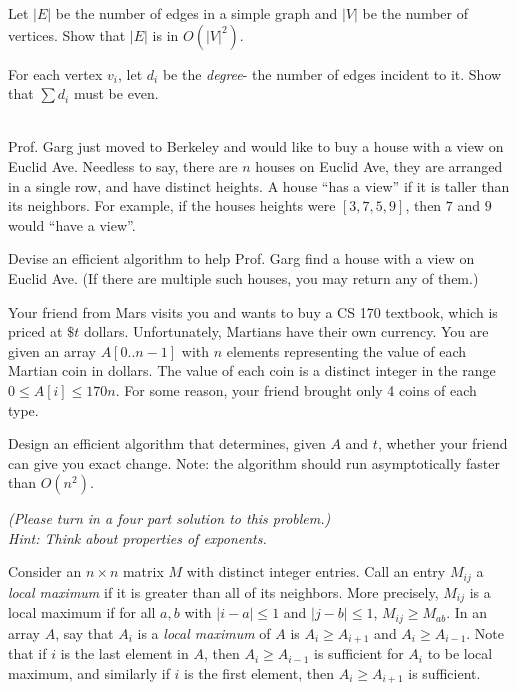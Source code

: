 \begin{qunlist}
\begin{qparts}
\item Let $|E|$ be the number of edges in a simple graph and $|V|$ be the number of vertices. Show that $|E|$ is in $O(|V|^2).$



\item For each vertex $v_i$, let $d_i$ be the \textit{degree}- the number of edges incident to it. Show that $\sum d_i$ must be even.



\end{qparts}

\pagebreak


 \\
Prof. Garg just moved to Berkeley and would like to buy a house with a view on Euclid Ave. 
Needless to say, there are $n$ houses on Euclid Ave, they are arranged in a single row, and have distinct heights. 
A house ``has a view'' if it is taller than its neighbors. 
For example, if the houses heights were $[3, 7, 5, 9]$, then $7$ and $9$ would ``have a view''.

Devise an efficient algorithm to help Prof. Garg find a house with a view on Euclid Ave. 
(If there are multiple such houses, you may return any of them.)



\pagebreak


Your friend from Mars visits you and wants to buy a CS 170 textbook, which is priced at $\$t$ dollars. Unfortunately, Martians have their own currency. You are given an array $A[0..n-1]$ with $n$ elements representing the value of each Martian coin in dollars. The value of each coin is a distinct integer in the range $0 \le A[i] \le 170n$. For some reason, your friend brought only 4 coins of each type. 

Design an efficient algorithm that determines, given $A$ and $t$, whether your friend can give you exact change. Note: the algorithm should run asymptotically faster than $O(n^2)$.

\textit{(Please turn in a four part solution to this problem.)}\\
\textit{Hint: Think about properties of exponents.}



\pagebreak
{}

Consider an $n\times n$ matrix $M$ with distinct integer entries. Call an entry $M_{ij}$ a \emph{local maximum} if it is greater than all of its neighbors. More precisely, $M_{ij}$ is a local maximum if for all $a,b$ with $|i-a|\le 1$ and $|j-b|\le 1$, $M_{ij} \ge M_{ab}$. In an array $A$, say that $A_i$ is a \emph{local maximum} of $A$ is $A_i \ge A_{i+1}$ and $A_i \ge A_{i-1}$. Note that if $i$ is the last element in $A$, then $A_i \geq A_{i-1}$ is sufficient for $A_i$ to be local maximum, and similarly if $i$ is the first element, then $A_i \geq A_{i+1}$ is sufficient.


\end{qunlist}
